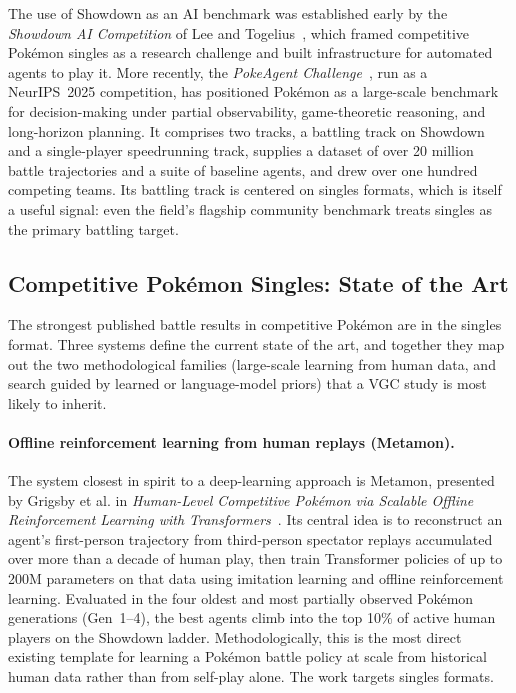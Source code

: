 The use of Showdown as an AI benchmark was established early by the
\emph{Showdown AI Competition} of Lee and Togelius~\cite{lee2017showdown}, which
framed competitive Pok\'{e}mon singles as a research challenge and built
infrastructure for automated agents to play it. More recently, the
\emph{PokeAgent Challenge}~\cite{karten2025pokeagent}, run as a NeurIPS~2025
competition, has positioned Pok\'{e}mon as a large-scale benchmark for
decision-making under partial observability, game-theoretic reasoning, and
long-horizon planning. It comprises two tracks, a battling track on Showdown and
a single-player speedrunning track, supplies a dataset of over 20 million battle
trajectories and a suite of baseline agents, and drew over one hundred competing
teams. Its battling track is centered on singles formats, which is itself a useful
signal: even the field's flagship community benchmark treats singles as the
primary battling target.

\subsection{Competitive Pok\'{e}mon Singles: State of the Art}
\label{subsec:app_singles}

The strongest published battle results in competitive Pok\'{e}mon are in the
singles format. Three systems define the current state of the art, and together
they map out the two methodological families (large-scale learning from human
data, and search guided by learned or language-model priors) that a VGC study is
most likely to inherit.

\paragraph{Offline reinforcement learning from human replays (Metamon).}
The system closest in spirit to a deep-learning approach is Metamon, presented by
Grigsby et al. in \emph{Human-Level Competitive Pok\'{e}mon via Scalable Offline
Reinforcement Learning with Transformers}~\cite{grigsby2025metamon}. Its central
idea is to reconstruct an agent's first-person trajectory from third-person
spectator replays accumulated over more than a decade of human play, then train
Transformer policies of up to 200M parameters on that data using imitation
learning and offline reinforcement learning. Evaluated in the four oldest and
most partially observed Pok\'{e}mon generations (Gen~1--4), the best agents climb
into the top 10\% of active human players on the Showdown ladder. Methodologically,
this is the most direct existing template for learning a Pok\'{e}mon battle policy
at scale from historical human data rather than from self-play alone. The work
targets singles formats.

